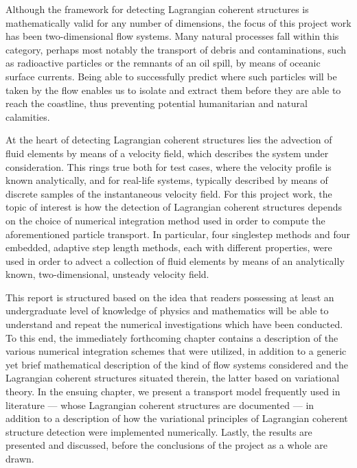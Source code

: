 Although the framework for detecting Lagrangian coherent structures is
mathematically valid for any number of dimensions, the focus of this project
work has been two-dimensional flow systems. Many natural processes fall
within this category, perhaps most notably the transport of debris and
contaminations, such as radioactive particles or the remnants of an oil
spill, by means of oceanic surface currents. Being able to successfully predict
where such particles will be taken by the flow enables us to isolate and
extract them before they are able to reach the coastline, thus preventing
potential humanitarian and natural calamities.

\newpage

At the heart of detecting Lagrangian coherent structures lies the advection
of fluid elements by means of a velocity field, which describes the system
under consideration. This rings true both for test cases, where the velocity
profile is known analytically, and for real-life systems, typically described
by means of discrete samples of the instantaneous velocity field. For this
project work, the topic of interest is how the detection of Lagrangian coherent
structures depends on the choice of numerical integration method used in order
to compute the aforementioned particle transport. In particular, four singlestep
methods and four embedded, adaptive step length methods, each with different
properties, were used in order to advect a collection of fluid elements
by means of an analytically known, two-dimensional, unsteady velocity field.

This report is structured based on the idea that readers possessing
at least an undergraduate level of knowledge of physics and mathematics will be
able to understand and repeat the numerical investigations which have been
conducted. To this end, the immediately forthcoming chapter contains a
description of the various numerical integration schemes that were
utilized, in addition to a generic yet brief mathematical description of
the kind of flow systems considered and the Lagrangian coherent structures
situated therein, the latter based on variational theory. In the ensuing
chapter, we present a transport model frequently used in literature --- whose
Lagrangian coherent structures are documented --- in addition to a description
of how the variational principles of Lagrangian coherent structure detection
were implemented numerically. Lastly, the results are presented and discussed,
before the conclusions of the project as a whole are drawn.


